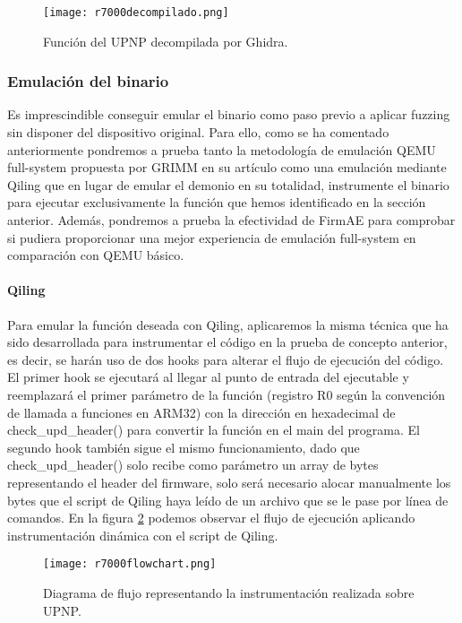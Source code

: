 \begin{figure}[H]
    \centering
    \texttt{[image: r7000decompilado.png]}
    \caption{Función del UPNP decompilada por Ghidra.}
    \label{fig:R7000decompilado}
\end{figure}

\subsubsection{Emulación del binario}
Es imprescindible conseguir emular el binario como paso previo a aplicar fuzzing sin disponer del dispositivo original. Para ello, como se ha comentado 
anteriormente pondremos a prueba tanto la metodología de emulación QEMU full-system propuesta por GRIMM en su artículo como una emulación mediante 
Qiling\cite{qiling} que en lugar de emular el demonio en su totalidad, instrumente el binario para ejecutar exclusivamente la función que hemos identificado 
en la sección anterior. Además, pondremos a prueba la efectividad de FirmAE\cite{Kim2020} para comprobar si pudiera proporcionar una mejor experiencia de 
emulación full-system en comparación con QEMU básico.

\paragraph{Qiling}
Para emular la función deseada con Qiling, aplicaremos la misma técnica que ha sido desarrollada para instrumentar el código en la prueba de concepto anterior, es decir, se harán uso 
de dos hooks para alterar el flujo de ejecución del código. El primer hook se ejecutará al llegar al punto de entrada del ejecutable y reemplazará el primer 
parámetro de la función (registro R0 según la convención de llamada a funciones en ARM32) con la dirección en hexadecimal de check\_upd\_header() para convertir 
la función en el main del programa. El segundo hook también sigue el mismo funcionamiento, dado que check\_upd\_header() solo recibe como parámetro un array 
de bytes representando el header del firmware, solo será necesario alocar manualmente los bytes que el script de Qiling haya leído de un archivo que se le 
pase por línea de comandos. En la figura \ref{fig:R7000flowchart} podemos observar el flujo de ejecución aplicando instrumentación 
dinámica con el script de Qiling.

\begin{figure}[H]
    \centering
    \texttt{[image: r7000flowchart.png]}
    \caption{Diagrama de flujo representando la instrumentación realizada sobre UPNP.}
    \label{fig:R7000flowchart}
\end{figure}

